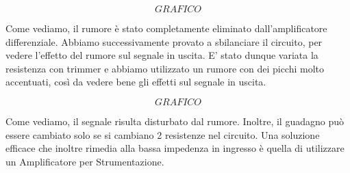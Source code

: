 $$GRAFICO$$



Come vediamo, il rumore è stato completamente eliminato dall'amplificatore differenziale. Abbiamo successivamente provato a sbilanciare il circuito, per vedere l'effetto del rumore sul segnale in uscita. E' stato dunque variata la resistenza con trimmer e abbiamo utilizzato un rumore con dei picchi molto accentuati, così da vedere bene gli effetti sul segnale in uscita. 




$$GRAFICO$$




Come vediamo, il segnale risulta disturbato dal rumore. Inoltre, il guadagno può essere cambiato solo se si cambiano 2 resistenze nel circuito. Una soluzione efficace che inoltre rimedia alla bassa impedenza in ingresso è quella di utilizzare un Amplificatore per Strumentazione.
